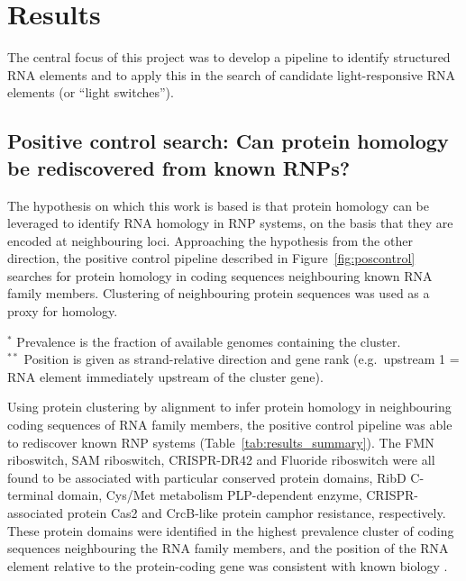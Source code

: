 \chapter{Results}

The central focus of this project was to develop a pipeline to identify structured RNA elements and to apply this in the search of candidate light-responsive RNA elements (or ``light switches'').


\section{Positive control search: Can protein homology be rediscovered from known \ac{RNP}s?}

The hypothesis on which this work is based is that protein homology can be leveraged to identify RNA homology in \ac{RNP} systems, on the basis that they are encoded at neighbouring loci.
Approaching the hypothesis from the other direction, the positive control pipeline described in Figure~\ref{fig:poscontrol} searches for protein homology in coding sequences neighbouring known RNA family members.
Clustering of neighbouring protein sequences was used as a proxy for homology.

\begin{table}[H]
\centering
\footnotesize
\caption[Top cluster for each RNA family]{\textbf{Top cluster (by genome prevalence) for each RNA family} }
    \label{tab:results_summary}
    
    \par\smallskip
    \begin{minipage}{\textwidth}
        \raggedright
        $^{*}$ Prevalence is the fraction of available genomes containing the cluster.\\
        $^{**}$ Position is given as strand-relative direction and gene rank (e.g.\ upstream 1 = RNA element immediately upstream of the cluster gene).
    \end{minipage}
\end{table}

Using protein clustering by alignment to infer protein homology in neighbouring coding sequences of RNA family members, the positive control pipeline was able to rediscover known \ac{RNP} systems (Table~\ref{tab:results_summary}).
The \ac{FMN} riboswitch, \ac{SAM} riboswitch, \ac{CRISPR}-DR42 and Fluoride riboswitch were all found to be associated with particular conserved protein domains, RibD C-terminal domain, Cys/Met metabolism PLP-dependent enzyme, CRISPR-associated protein Cas2 and CrcB-like protein camphor resistance, respectively.
These protein domains were identified in the highest prevalence cluster of coding sequences neighbouring the RNA family members, and the position of the RNA element relative to the protein-coding gene was consistent with known biology \citep{Mironov2002}.

